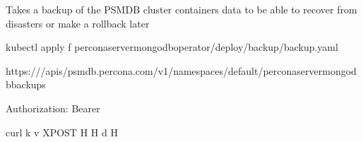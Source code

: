 \documentclass[letterpaper,10pt,english]{sphinxmanual}
\begin{document}
\begin{sphinxVerbatim}[commandchars=\\\{\}]
Takes a backup of the PSMDB cluster containers data to be able to recover from disasters or make a roll\PYGZhy{}back later
\end{sphinxVerbatim}


\begin{sphinxVerbatim}[commandchars=\\\{\}]
kubectl apply \PYGZhy{}f percona\PYGZhy{}server\PYGZhy{}mongodb\PYGZhy{}operator/deploy/backup/backup.yaml
\end{sphinxVerbatim}


\begin{sphinxVerbatim}[commandchars=\\\{\}]
https:///apis/psmdb.percona.com/v1/namespaces/default/perconaservermongodbbackups
\end{sphinxVerbatim}


\begin{sphinxVerbatim}[commandchars=\\\{\}]
Authorization: Bearer 
\end{sphinxVerbatim}


\begin{sphinxVerbatim}[commandchars=\\\{\}]
curl \PYGZhy{}k \PYGZhy{}v \PYGZhy{}XPOST  
            \PYGZhy{}H  
            \PYGZhy{}H  
            \PYGZhy{}d  \PYGZhy{}H 
\end{sphinxVerbatim}

\end{document}
